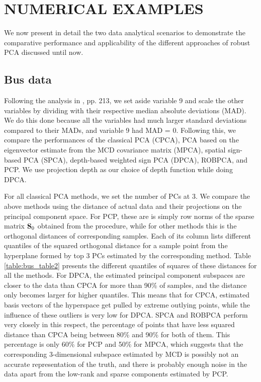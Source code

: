 \section*{\sffamily \Large NUMERICAL EXAMPLES}
\label{section:sec4}

We now present in detail the two data analytical scenarios to demonstrate the comparative performance and applicability of the different approaches of robust PCA discussed until now.

\subsection*{\sffamily \large Bus data}
Following the analysis in \cite{maronna06}, pp. 213, we set aside variable 9 and scale the other variables by dividing with their respective median absolute deviations (MAD). We do this done because all the variables had much larger standard deviations compared to their MADs, and variable 9 had MAD = 0. Following this, we compare the performances of the classical PCA (CPCA), PCA based on the eigenvector estimate from the MCD covariance matrix (MPCA), spatial sign-based PCA (SPCA), depth-based weighted sign PCA (DPCA), ROBPCA, and PCP.
We use projection depth as our choice of depth function while doing DPCA.

For all classical PCA methods, we set the number of PCs at 3. We compare the above methods using the distance of actual data and their projections on the principal component space. For PCP, these are is simply row norms of the sparse matrix ${\mathbf{S}}_0$ obtained from the procedure, while for other methods this is the orthogonal distances of corresponding samples. Each of its column lists different quantiles of the squared orthogonal distance for a sample point from the hyperplane formed by top 3 PCs estimated by the corresponding method. Table \ref{table:bus_table2} presents the different quantiles of squares of these distances for all the methods. For DPCA, the estimated principal component subspaces are closer to the data than CPCA for more than 90\% of samples, and the distance only becomes larger for higher quantiles. This means that for CPCA, estimated basis vectors of the hyperspace get pulled by extreme outlying points, while the influence of these outliers is very low for DPCA. SPCA and ROBPCA perform very closely in this respect, the percentage of points that have less squared distance than CPCA being between 80\% and 90\% for both of them. This percentage is only 60\% for PCP and 50\% for MPCA, which suggests that the corresponding 3-dimensional subspace estimated by MCD is possibly not an accurate representation of the truth, and there is probably enough noise in the data apart from the low-rank and sparse components estimated by PCP.

